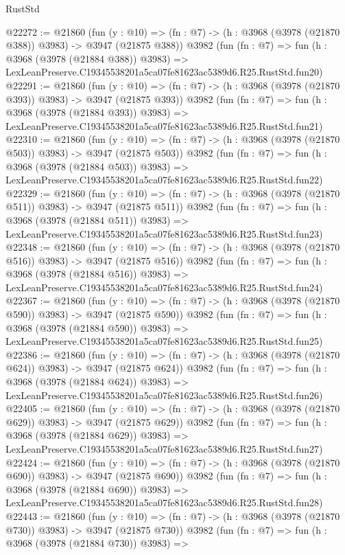 \begin{lexlean}{RustStd}
\begin{coremodule}
@22272 := @21860
    (fun (y : @10) => (fn : @7) -> (h : @3968 (@3978 (@21870 @388)) @3983) -> @3947 (@21875 @388))
    @3982
    (fun (fn : @7) =>
    fun (h : @3968 (@3978 (@21884 @388)) @3983) =>
    LexLeanPreserve.C19345538201a5ca07fe81623ac5389d6.R25.RustStd.fun20)
@22291 := @21860
    (fun (y : @10) => (fn : @7) -> (h : @3968 (@3978 (@21870 @393)) @3983) -> @3947 (@21875 @393))
    @3982
    (fun (fn : @7) =>
    fun (h : @3968 (@3978 (@21884 @393)) @3983) =>
    LexLeanPreserve.C19345538201a5ca07fe81623ac5389d6.R25.RustStd.fun21)
@22310 := @21860
    (fun (y : @10) => (fn : @7) -> (h : @3968 (@3978 (@21870 @503)) @3983) -> @3947 (@21875 @503))
    @3982
    (fun (fn : @7) =>
    fun (h : @3968 (@3978 (@21884 @503)) @3983) =>
    LexLeanPreserve.C19345538201a5ca07fe81623ac5389d6.R25.RustStd.fun22)
@22329 := @21860
    (fun (y : @10) => (fn : @7) -> (h : @3968 (@3978 (@21870 @511)) @3983) -> @3947 (@21875 @511))
    @3982
    (fun (fn : @7) =>
    fun (h : @3968 (@3978 (@21884 @511)) @3983) =>
    LexLeanPreserve.C19345538201a5ca07fe81623ac5389d6.R25.RustStd.fun23)
@22348 := @21860
    (fun (y : @10) => (fn : @7) -> (h : @3968 (@3978 (@21870 @516)) @3983) -> @3947 (@21875 @516))
    @3982
    (fun (fn : @7) =>
    fun (h : @3968 (@3978 (@21884 @516)) @3983) =>
    LexLeanPreserve.C19345538201a5ca07fe81623ac5389d6.R25.RustStd.fun24)
@22367 := @21860
    (fun (y : @10) => (fn : @7) -> (h : @3968 (@3978 (@21870 @590)) @3983) -> @3947 (@21875 @590))
    @3982
    (fun (fn : @7) =>
    fun (h : @3968 (@3978 (@21884 @590)) @3983) =>
    LexLeanPreserve.C19345538201a5ca07fe81623ac5389d6.R25.RustStd.fun25)
@22386 := @21860
    (fun (y : @10) => (fn : @7) -> (h : @3968 (@3978 (@21870 @624)) @3983) -> @3947 (@21875 @624))
    @3982
    (fun (fn : @7) =>
    fun (h : @3968 (@3978 (@21884 @624)) @3983) =>
    LexLeanPreserve.C19345538201a5ca07fe81623ac5389d6.R25.RustStd.fun26)
@22405 := @21860
    (fun (y : @10) => (fn : @7) -> (h : @3968 (@3978 (@21870 @629)) @3983) -> @3947 (@21875 @629))
    @3982
    (fun (fn : @7) =>
    fun (h : @3968 (@3978 (@21884 @629)) @3983) =>
    LexLeanPreserve.C19345538201a5ca07fe81623ac5389d6.R25.RustStd.fun27)
@22424 := @21860
    (fun (y : @10) => (fn : @7) -> (h : @3968 (@3978 (@21870 @690)) @3983) -> @3947 (@21875 @690))
    @3982
    (fun (fn : @7) =>
    fun (h : @3968 (@3978 (@21884 @690)) @3983) =>
    LexLeanPreserve.C19345538201a5ca07fe81623ac5389d6.R25.RustStd.fun28)
@22443 := @21860
    (fun (y : @10) => (fn : @7) -> (h : @3968 (@3978 (@21870 @730)) @3983) -> @3947 (@21875 @730))
    @3982
    (fun (fn : @7) =>
    fun (h : @3968 (@3978 (@21884 @730)) @3983) =>

\end{coremodule}
\end{lexlean}
